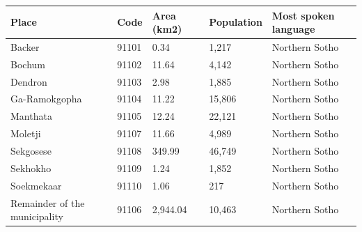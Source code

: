\documentclass{article}
\begin{document}
\begin{tabular}{lllll}
\toprule
Place & Code & Area (km2) & Population & Most spoken language \\
\midrule
Backer & 91101 & 0.34 & 1,217 & Northern Sotho \\
Bochum & 91102 & 11.64 & 4,142 & Northern Sotho \\
Dendron & 91103 & 2.98 & 1,885 & Northern Sotho \\
Ga-Ramokgopha & 91104 & 11.22 & 15,806 & Northern Sotho \\
Manthata & 91105 & 12.24 & 22,121 & Northern Sotho \\
Moletji & 91107 & 11.66 & 4,989 & Northern Sotho \\
Sekgosese & 91108 & 349.99 & 46,749 & Northern Sotho \\
Sekhokho & 91109 & 1.24 & 1,852 & Northern Sotho \\
Soekmekaar & 91110 & 1.06 & 217 & Northern Sotho \\
Remainder of the municipality & 91106 & 2,944.04 & 10,463 & Northern Sotho \\
\bottomrule
\end{tabular}
\end{document}
